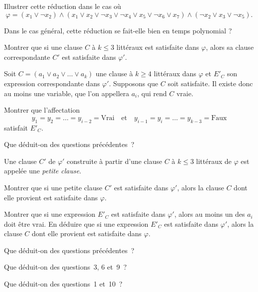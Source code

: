 \begin{exercice}
\begin{questions}
    \item Illustrer cette réduction dans le cas où
    \[
    \varphi = (x_1 \lor \neg x_2)
    \land (x_1 \lor x_2 \lor \neg x_3 \lor \neg x_4 \lor x_5 \lor \neg x_6 \lor x_7)
    \land (\neg x_2 \lor x_3 \lor \neg x_5).
    \]

    \item Dans le cas général, cette réduction se fait-elle bien en temps polynomial ?

    \item Montrer que si une clause $C$ à $k \le 3$ littéraux est satisfaite dans $\varphi$, alors sa clause correspondante $C'$ est satisfaite dans $\varphi'$.

    \medskip
    Soit $C = (a_1 \lor a_2 \lor \dots \lor a_k)$ une clause à $k \ge 4$ littéraux dans $\varphi$ et $E'_C$ son expression correspondante dans $\varphi'$.
    Supposons que $C$ soit satisfaite. Il existe donc au moins une variable, que l’on appellera $a_i$, qui rend $C$ vraie.

    \item Montrer que l’affectation
    \[
    y_1 = y_2 = \dots = y_{i-2} = \text{Vrai}
    \quad \text{et} \quad
    y_{i-1} = y_i = \dots = y_{k-3} = \text{Faux}
    \]
    satisfait $E'_C$.

    \item Que déduit-on des questions précédentes~?

    \medskip
    Une clause $C'$ de $\varphi'$ construite à partir d’une clause $C$ à $k \le 3$ littéraux de $\varphi$ est appelée une \emph{petite clause}.

    \item Montrer que si une petite clause $C'$ est satisfaite dans $\varphi'$, alors la clause $C$ dont elle provient est satisfaite dans $\varphi$.

    \item Montrer que si une expression $E'_C$ est satisfaite dans $\varphi'$, alors au moins un des $a_i$ doit être vrai.  
    En déduire que si une expression $E'_C$ est satisfaite dans $\varphi'$, alors la clause $C$ dont elle provient est satisfaite dans $\varphi$.

    \item Que déduit-on des questions précédentes~?

    \item Que déduit-on des questions~3, 6 et~9~?

    \item Que déduit-on des questions~1 et~10~?


\end{questions}
\end{exercice}
